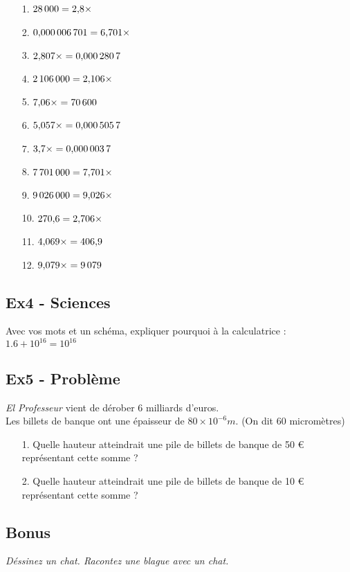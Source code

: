 \documentclass[12pt]{article}
\newcommand{\Pointilles}[1]{%
  \par\nobreak
  \noindent\rule{0pt}{1.5\baselineskip}%
  \multido{}{#1}{\noindent\makebox[\linewidth]{\dotfill}\endgraf}%
  \bigskip%
}
\begin{document}
\begin{multicols}{3}

  \begin{enumerate}
  \item[1.] $28\,000 = 2{,}8 \times \dotfill$
  \item[2.] $0{,}000\,006\,701 = 6{,}701 \times \dotfill$
  \item[3.] $2{,}807 \times \dotfill = 0{,}000\,280\,7$
  \item[4.] $2\,106\,000 = 2{,}106 \times \dotfill$
  \item[5.] $7{,}06 \times \dotfill = 70\,600$
  \item[6.] $5{,}057 \times \dotfill = 0{,}000\,505\,7$
  \item[7.] $3{,}7 \times \dotfill = 0{,}000\,003\,7$
  \item[8.] $7\,701\,000 = 7{,}701 \times \dotfill$
  \item[9.] $9\,026\,000 = 9{,}026 \times \dotfill$
  \item[10.] $270{,}6 = 2{,}706 \times \dotfill$
  \item[11.] $4{,}069 \times \dotfill = 406{,}9$
  \item[12.] $9{,}079 \times \dotfill = 9\,079$
  \end{enumerate}
\end{multicols}


\subsection*{Ex4 - Sciences}

Avec vos mots et un schéma, expliquer pourquoi à la calculatrice : $1.6 + 10^{16} = 10^{16}$ 
\Pointilles{8}

\newpage

\subsection*{Ex5 - Problème}

\textit{\og El Professeur \fg{} } vient de dérober 6 milliards d’euros. \\
Les billets de banque ont une épaisseur de $80 \times 10^{-6} m$. (On dit 60 micromètres)

\begin{itemize}
\item[1.] Quelle hauteur atteindrait une pile de billets de banque de 50 \euro{} représentant cette somme ?
\item[2.] Quelle hauteur atteindrait une pile de billets de banque de 10 \euro{} représentant cette somme ?
\end{itemize}

\Pointilles{20}

\subsection*{Bonus}

\textit{Déssinez un chat. Racontez une blague avec un chat.}
\end{document}
